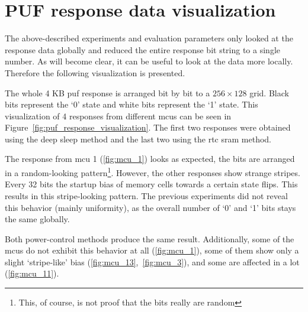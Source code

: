 \section{PUF response data visualization}

The above-described experiments and evaluation parameters only looked at the response data globally and reduced the entire response bit string to a single number. As will become clear, it can be useful to look at the data more locally. Therefore the following visualization is presented.

The whole 4 KB \gls{puf} response is arranged bit by bit to a $256 \times 128$ grid. Black bits represent the `0' state and white bits represent the `1' state. This visualization of 4 responses from different \glspl{mcu} can be seen in Figure~\ref{fig:puf_response_visualization}. The first two responses were obtained using the deep sleep method and the last two using the \gls{rtc} \gls{sram} method.

The response from \gls{mcu} 1 (\ref{fig:mcu_1}) looks as expected, the bits are arranged in a random-looking pattern\footnote{This, of course, is not proof that the bits really are random}. However, the other responses show strange stripes. Every 32 bits the startup bias of memory cells towards a certain state flips. This results in this stripe-looking pattern. The previous experiments did not reveal this behavior (mainly uniformity), as the overall number of  `0' and `1' bits stays the same globally.

Both power-control methods produce the same result. Additionally, some of the \glspl{mcu} do not exhibit this behavior at all (\ref{fig:mcu_1}), some of them show only a slight `stripe-like' bias (\ref{fig:mcu_13},~\ref{fig:mcu_3}), and some are affected in a lot (\ref{fig:mcu_11}).

